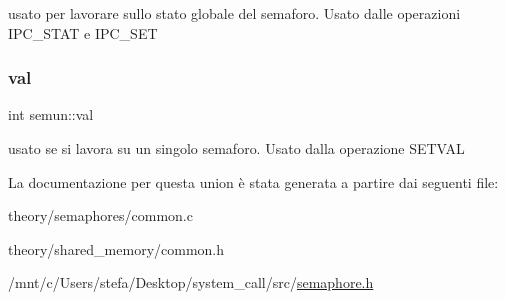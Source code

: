 usato per lavorare sullo stato globale del semaforo. Usato dalle operazioni I\+P\+C\+\_\+\+S\+T\+AT e I\+P\+C\+\_\+\+S\+ET \mbox{\label{unionsemun_ac6121ecb6d04a024e07e12bd71b94031}} 
\subsubsection{\texorpdfstring{val}{val}}
{\footnotesize\ttfamily int semun\+::val}

usato se si lavora su un singolo semaforo. Usato dalla operazione S\+E\+T\+V\+AL 

La documentazione per questa union è stata generata a partire dai seguenti file\+:\begin{DoxyCompactItemize}
\item 
theory/semaphores/common.\+c\item 
theory/shared\+\_\+memory/common.\+h\item 
/mnt/c/\+Users/stefa/\+Desktop/system\+\_\+call/src/\hyperlink{semaphore_8h}{semaphore.\+h}\end{DoxyCompactItemize}
